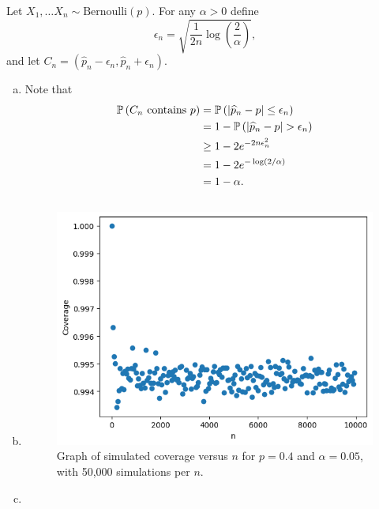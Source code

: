 \begin{ex}
  Let $X_1,\ldots X_n\sim\text{Bernoulli}(p)$. For any $\alpha>0$ define
  \[
    \epsilon_n=\sqrt{\frac{1}{2n}\log\left(\frac{2}{\alpha}\right)},
  \]
  and let $C_n=(\widehat{p}_n-\epsilon_n, \widehat{p}_n+\epsilon_n)$.
  \begin{enumerate}[(a)]
    \item Note that
          \begin{align*}
            \P{C_n\text{ contains } p}
             & =\P{|\widehat{p}_n-p|\leq \epsilon_n} \\
             & =1-\P{|\widehat{p}_n-p|> \epsilon_n}  \\
             & \geq 1-2e^{-2n\epsilon_n^2}           \\
             & =1-2e^{-\log(2/\alpha)}               \\
             & =1 - \alpha.
          \end{align*}
    \item
          \inputminted{python}{../code/04-04b.py}

          \begin{figure}[H]
            \centering
            \includegraphics[scale=0.9]{../images/04-04b}
            \caption{Graph of simulated coverage versus $n$ for $p=0.4$ and
              $\alpha=0.05$, with 50,000 simulations per $n$.}
          \end{figure}
    \item
          \inputminted{python}{../code/04-04c.py}
          \inputminted{text}{../output/04-04c.txt}


\end{enumerate}
\end{ex}
